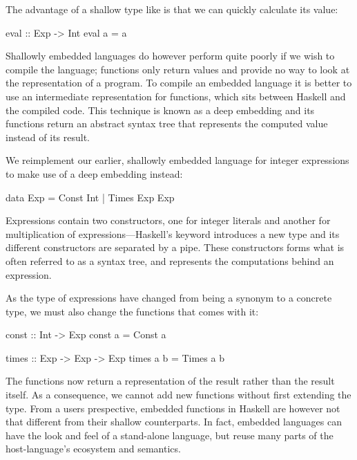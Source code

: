 \documentclass[../main.tex]{subfiles}
\begin{document}
The advantage of a shallow type like  is that we can quickly calculate its value:

\begin{code}
eval :: Exp -> Int
eval a = a
\end{code}

\noindent Shallowly embedded languages do however perform quite poorly if we wish to compile the language; functions only return values and provide no way to look at the representation of a program. To compile an embedded language it is better to use an intermediate representation for functions, which sits between Haskell and the compiled code. This technique is known as a deep embedding and its functions return an abstract syntax tree that represents the computed value instead of its result.

We reimplement our earlier, shallowly embedded language for integer expressions to make use of a deep embedding instead:

\begin{code}
data Exp = Const Int | Times Exp Exp
\end{code}

\noindent Expressions contain two constructors, one for integer literals and another for multiplication of expressions---Haskell's  keyword introduces a new type and its different constructors are separated by a pipe. These constructors forms what is often referred to as a syntax tree, and represents the computations behind an expression.

As the type of expressions have changed from being a synonym to a concrete type, we must also change the functions that comes with it:


\begin{code}
const :: Int -> Exp
const a = Const a

times :: Exp -> Exp -> Exp
times a b = Times a b
\end{code}

\noindent The functions now return a representation of the result rather than the result itself. As a consequence, we cannot add new functions without first extending the  type. From a users prespective, embedded functions in Haskell are however not that different from their shallow counterparts. In fact, embedded languages can have the look and feel of a stand-alone language, but reuse many parts of the host-language's ecosystem and semantics.
\end{document}
